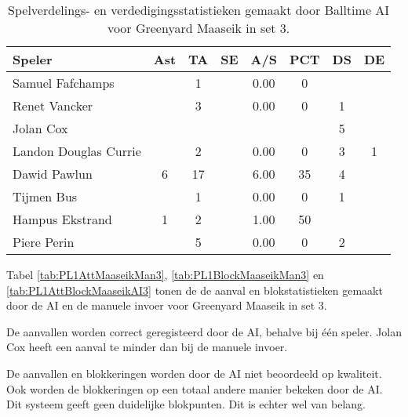 \begin{table}[ht!]
  \centering
  \scriptsize
  \begin{tabular}{|l|c|c|c|c|c|c|c|} \hline
    \textbf{Speler} & Ast & TA & SE & A/S & PCT & DS & DE \\ \hline
    Samuel Fafchamps &  & 1 &  & 0.00 & 0 &  &  \\
    Renet Vancker &  & 3 &  & 0.00 & 0 & 1 &  \\
    Jolan Cox &  &  &  &  &  & 5 &  \\
    Landon Douglas Currie &  & 2 &  & 0.00 & 0 & 3 & 1 \\
    Dawid Pawlun & 6 & 17 &  & 6.00 & 35 & 4 &  \\
    Tijmen Bus &  & 1 &  & 0.00 & 0 & 1 &  \\
    Hampus Ekstrand & 1 & 2 &  & 1.00 & 50 &  &  \\
    Piere Perin &  & 5 &  & 0.00 & 0 & 2 &  \\  \hline
  \end{tabular}
  \caption[Spelverdelings- en verdedigingsstatistieken gemaakt door Balltime AI voor Greenyard Maaseik in set 3]{\label{tab:PL1SetDigMaaseikAI3}Spelverdelings- en verdedigingsstatistieken gemaakt door Balltime AI voor Greenyard Maaseik in set 3.}
\end{table}

Tabel \ref{tab:PL1AttMaaseikMan3}, \ref{tab:PL1BlockMaaseikMan3} en \ref{tab:PL1AttBlockMaaseikAI3} tonen de de aanval en blokstatistieken gemaakt door de AI en de manuele invoer voor Greenyard Maaseik in set 3. 

De aanvallen worden correct geregisteerd door de AI, behalve bij één speler. Jolan Cox heeft een aanval te minder dan bij de manuele invoer. 

De aanvallen en blokkeringen worden door de AI niet beoordeeld op kwaliteit. Ook worden de blokkeringen op een totaal andere manier bekeken door de AI. Dit systeem geeft geen duidelijke blokpunten. Dit is echter wel van belang.

